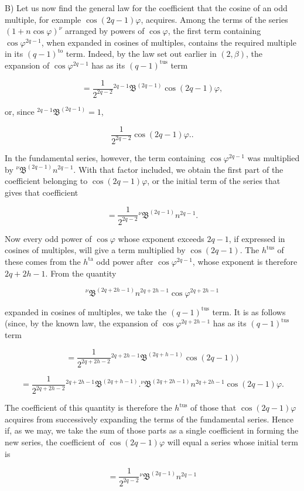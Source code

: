 \par\noindent{}%
\hspace*{\parindent}B) Let us now find the general law for the coefficient that the cosine of an odd multiple, for example $\cos(2q-1)\varphi$, acquires. Among the terms of the series $(1+n\cos\varphi)^{\nu}$ arranged by powers of $\cos\varphi$, the first term containing $\cos\varphi^{2q-1}$, when expanded in cosines of multiples, contains the required multiple in its $(q-1)^{\text{to}}$ term. Indeed, by the law set out earlier in $(2,\beta)$, the expansion of $\cos\varphi^{2q-1}$ has as its $(q-1)^{\text{tus}}$ term

\[
= \frac{1}{2^{2q-2}} {}^{2q-1}\mathfrak{B}^{(2q-1)} \cos(2q-1)\varphi,
\]

\noindent or, since ${}^{2q-1}\mathfrak{B}^{(2q-1)} = 1$,

\[
\frac{1}{2^{2q-2}} \cos(2q-1)\varphi..
\]

\noindent In the fundamental series, however, the term containing $\cos\varphi^{2q-1}$ was multiplied by ${}^{\nu}\mathfrak{B}^{(2q-1)} n^{2q-1}$. With that factor included, we obtain the first part of the coefficient belonging to $\cos(2q-1)\varphi$, or the initial term of the series that gives that coefficient

\[
= \frac{1}{2^{2q-2}} {}^{\nu}\mathfrak{B}^{(2q-1)} n^{2q-1}.
\]

\noindent Now every odd power of $\cos\varphi$ whose exponent exceeds $2q-1$, if expressed in cosines of multiples, will give a term multiplied by $\cos(2q-1)$. The $h^{\text{tus}}$ of these comes from the $h^{\text{ta}}$ odd power after $\cos\varphi^{2q-1}$, whose exponent is therefore $2q+2h-1$. From the quantity

\[
{}^{\nu}\mathfrak{B}^{(2q+2h-1)} n^{2q+2h-1} \cos\varphi^{2q+2h-1}
\]

\noindent expanded in cosines of multiples, we take the $(q-1)^{\text{tus}}$ term. It is as follows (since, by the known law, the expansion of $\cos\varphi^{2q+2h-1}$ has as its $(q-1)^{\text{tus}}$ term

\[
= \frac{1}{2^{2q+2h-2}} {}^{2q+2h-1}\mathfrak{B}^{(2q+h-1)} \cos(2q-1)) 
\]

\[
= \frac{1}{2^{2q+2h-2}} {}^{2q+2h-1}\mathfrak{B}^{(2q+h-1)}  .  {}^{\nu}\mathfrak{B}^{(2q+2h-1)} n^{2q+2h-1} \cos(2q-1)\varphi.
\]

\noindent The coefficient of this quantity is therefore the $h^{\text{tus}}$ of those that $\cos(2q-1)\varphi$ acquires from successively expanding the terms of the fundamental series. Hence if, as we may, we take the sum of those parts as a single coefficient in forming the new series, the coefficient of $\cos(2q-1)\varphi$ will equal a series whose initial term is

\[
= \frac{1}{2^{2q-2}} {}^{\nu}\mathfrak{B}^{(2q-1)} n^{2q-1}
\]
